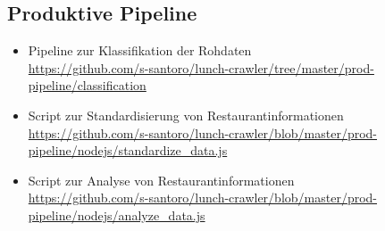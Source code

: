 \subsection{Produktive Pipeline}
\begin{itemize}
	\item Pipeline zur Klassifikation der Rohdaten\\ 
	\url{https://github.com/s-santoro/lunch-crawler/tree/master/prod-pipeline/classification}
	\item Script zur Standardisierung von Restaurantinformationen\\ 
	\url{https://github.com/s-santoro/lunch-crawler/blob/master/prod-pipeline/nodejs/standardize_data.js}
	\item Script zur Analyse von Restaurantinformationen\\ 
	\url{https://github.com/s-santoro/lunch-crawler/blob/master/prod-pipeline/nodejs/analyze_data.js}
\end{itemize} 



